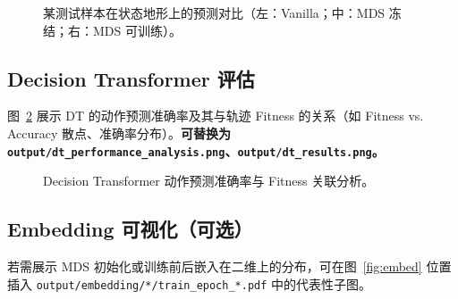 \documentclass[UTF8,11pt]{ctexart}
\begin{document}
\begin{figure}[H]
    \centering
    \begin{minipage}{0.32\linewidth}
        \centering
    \end{minipage}
    \hfill
    \begin{minipage}{0.32\linewidth}
        \centering
    \end{minipage}
    \hfill
    \begin{minipage}{0.32\linewidth}
        \centering
    \end{minipage}
    \caption{某测试样本在状态地形上的预测对比（左：Vanilla；中：MDS 冻结；右：MDS 可训练）。}
    \label{fig:traj}
\end{figure}

\subsection{Decision Transformer 评估}
图~\ref{fig:dt} 展示 DT 的动作预测准确率及其与轨迹 Fitness 的关系（如 Fitness vs. Accuracy 散点、准确率分布）。\textbf{可替换为 \texttt{output/dt\_performance\_analysis.png}、\texttt{output/dt\_results.png}。}

\begin{figure}[H]
    \centering
    \caption{Decision Transformer 动作预测准确率与 Fitness 关联分析。}
    \label{fig:dt}
\end{figure}

\subsection{Embedding 可视化（可选）}
若需展示 MDS 初始化或训练前后嵌入在二维上的分布，可在图~\ref{fig:embed} 位置插入 \texttt{output/embedding/*/train\_epoch\_*.pdf} 中的代表性子图。
\end{document}
